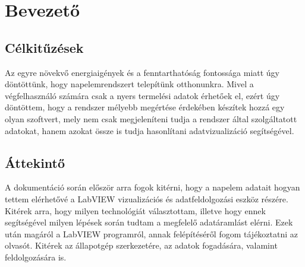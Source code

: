 \chapter{Bevezető}

\section{Célkitűzések}

Az egyre növekvő energiaigények és a fenntarthatóság fontossága miatt úgy
döntöttünk, hogy napelemrendszert telepítünk otthonunkra. Mivel a végfelhasználó
számára csak a nyers termelési adatok érhetőek el, ezért úgy döntöttem, hogy
a rendszer mélyebb megértése érdekében készítek hozzá egy olyan szoftvert,
mely nem csak megjeleníteni tudja a rendszer által szolgáltatott adatokat,
hanem azokat össze is tudja hasonlítani adatvizualizáció segítségével.

\section{Áttekintő}

A dokumentáció során először arra fogok kitérni, hogy a napelem adatait
hogyan tettem elérhetővé a LabVIEW vizualizációs és adatfeldolgozási eszköz
részére. Kitérek arra, hogy milyen technológiát választottam, illetve hogy
ennek segítségével milyen lépések során tudtam a megfelelő adatáramlást
elérni. Ezek után magáról a LabVIEW programról, annak felépítéséről fogom
tájékoztatni az olvasót. Kitérek az állapotgép szerkezetére, az adatok
fogadására, valamint feldolgozására is.

